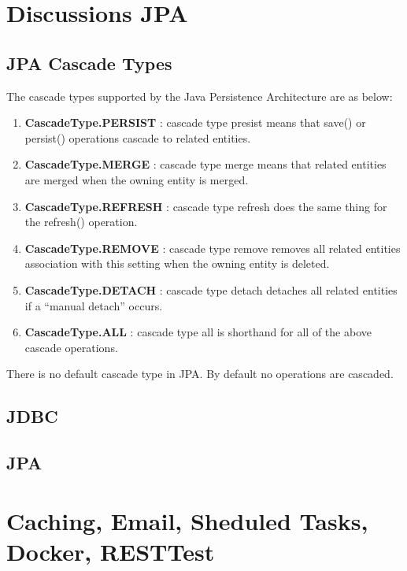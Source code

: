\documentclass[a4paper,10pt]{scrreprt}
\begin{document}
\chapter{Discussions JPA}
\section{JPA Cascade Types}
The cascade types supported by the Java Persistence Architecture are as below:
\begin{enumerate}
	 
\item  \textbf{CascadeType.PERSIST} : cascade type presist means that save() or persist() operations cascade to related entities.
\item  \textbf{CascadeType.MERGE} : cascade type merge means that related entities are merged when the owning entity is merged.
\item  \textbf{CascadeType.REFRESH} : cascade type refresh does the same thing for the refresh() operation.
\item  \textbf{CascadeType.REMOVE} : cascade type remove removes all related entities association with this setting when the owning entity is deleted.
\item  \textbf{CascadeType.DETACH} : cascade type detach detaches all related entities if a “manual detach” occurs.
\item  \textbf{CascadeType.ALL} : cascade type all is shorthand for all of the above cascade operations.
\end{enumerate}
There is no default cascade type in JPA. By default no operations are cascaded.
\section{JDBC}
 
\section{JPA}
 
  
\chapter{Caching, Email, Sheduled Tasks, Docker, RESTTest}
 
 
\end{document}
